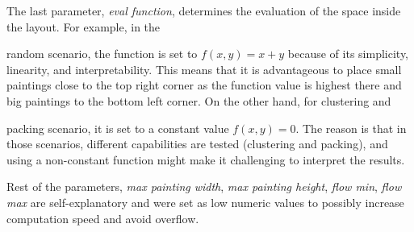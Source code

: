 The last parameter, \textit{eval function}, determines the evaluation of the space inside the layout.
For example, in the {random scenario, the function is set to $f(x,y) = x+y$ because of its simplicity, linearity, and interpretability.
This means that it is advantageous to place small paintings close to the top right corner as the function value is highest there and
big paintings to the bottom left corner.
On the other hand, for clustering and {packing scenario, it is set to a constant value $f(x,y) = 0$.
The reason is that in those scenarios, different
capabilities are tested (clustering and packing), and using a non-constant function might make
it challenging to interpret the results.

Rest of the parameters, \textit{max painting width}, \textit{max painting height}, \textit{flow min}, \textit{flow max}
are self-explanatory and were set as low numeric values to possibly increase computation speed and avoid overflow.


}}
